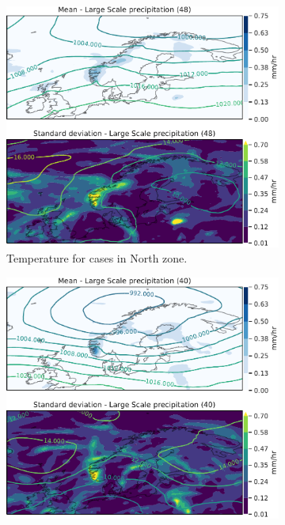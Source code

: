 \begin{figure}
\begin{subfigure}[b]{0.49\textwidth}
    \centering
    \includegraphics[width=\textwidth]{Figures/lsPNord.pdf}
    \caption{Temperature for cases in North zone.}
    \label{fig:NordlsP}
\end{subfigure}
\begin{subfigure}[b]{0.49\textwidth}
    \centering
    \includegraphics[width=\textwidth]{Figures/lsPNordvest.pdf}

\end{subfigure}
\end{figure}
